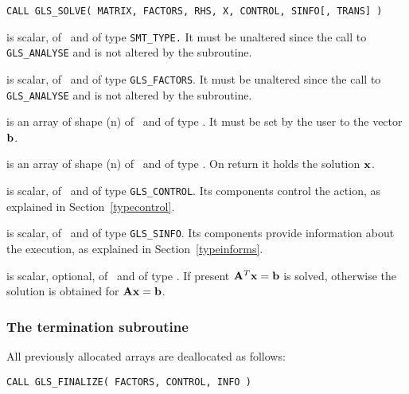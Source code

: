 \documentclass{galahad}
\newcommand{\packagename}{GLS}
\begin{document}
\hspace{8mm}
{\tt CALL \packagename\_SOLVE( MATRIX, FACTORS, RHS, X, CONTROL, 
SINFO[, TRANS] )}

\begin{description}

 is scalar, of \intentin\ and of type {\tt SMT\_TYPE.}  It
must be unaltered since the call to {\tt \packagename\_ANALYSE} and is 
not altered by the subroutine.

 is scalar, of \intentin\ and of type {\tt \packagename\_FACTORS}. 
It must be unaltered since the call to {\tt \packagename\_ANALYSE} and is 
not altered by the subroutine.

 is an array of shape ({n}) of \intentin\ and of type \realdp. 
It must be set by the user to the vector ${\mathbf{b}}$.

 is an array of shape ({n}) of \intentout\ and of type \realdp. 
On return it holds the solution ${\mathbf{x}}$.

 is scalar, of \intentin\ and of type {\tt \packagename\_CONTROL}. 
Its components control the action, as explained in 
Section~\ref{typecontrol}.

 is scalar, of \intentout\ and of type {\tt \packagename\_SINFO}.  
Its components provide information about the execution, as explained in
Section~\ref{typeinforms}.

 is scalar, optional, of \intentin\ and of type \integer. 
If present ${\mathbf{A}}^T {\mathbf{x}} = {\mathbf{b}}$ is solved, otherwise the solution
is obtained for ${\mathbf{A}} {\mathbf{x}} = {\mathbf{b}}$.

\end{description}


\subsubsection{The termination subroutine}
All previously allocated arrays are deallocated as follows:

\hspace{8mm}
{\tt CALL \packagename\_FINALIZE( FACTORS, CONTROL, INFO )}
\end{document}
